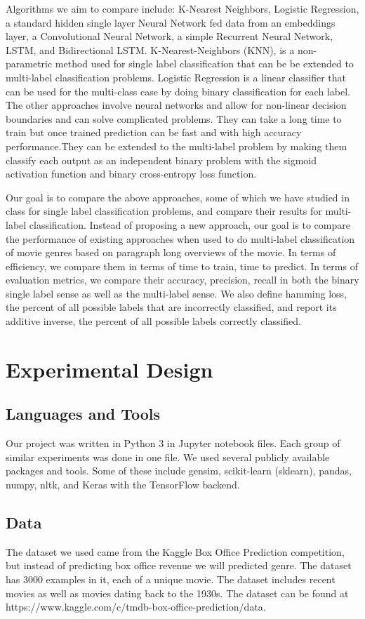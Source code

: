 \documentclass[sigconf]{acmart}
\begin{document}
Algorithms we aim to compare include: K-Nearest Neighbors, Logistic Regression, a standard hidden single layer Neural Network fed data from an embeddings layer, a Convolutional Neural Network, a simple Recurrent Neural Network, LSTM, and Bidirectional LSTM. K-Nearest-Neighbors (KNN), is a non-parametric method used for single label classification that can be be extended to multi-label classification problems. Logistic Regression is a linear classifier that can be used for the multi-class case by doing binary classification for each label. The other approaches involve neural networks and allow for non-linear decision boundaries and can solve complicated problems. They can take a long time to train but once trained prediction can be fast and with high accuracy performance.They can be extended to the multi-label problem by making them classify each output as an independent binary problem with the sigmoid activation function and binary cross-entropy loss function.  

Our goal is to compare the above approaches, some of which we have studied in class for single label classification problems, and compare their results for multi-label classification. Instead of proposing a new approach, our goal is to compare the performance of existing approaches when used to do multi-label classification of movie genres based on paragraph long overviews of the movie. In terms of efficiency, we compare them in terms of time to train, time to predict. In terms of evaluation metrics, we compare their accuracy, precision, recall in both the binary single label sense as well as the multi-label sense. We also define hamming loss, the percent of all possible labels that are incorrectly classified, and report its additive inverse, the percent of all possible labels correctly classified. 

\section{Experimental Design}
\subsection{Languages and Tools}
Our project was written in Python 3 in Jupyter notebook files.  Each group of similar experiments was done in one file.  We used several publicly available packages and tools.  Some of these include gensim, scikit-learn (sklearn), pandas, numpy, nltk, and Keras with the TensorFlow backend. 

\subsection{Data}
The dataset we used came from the Kaggle Box Office Prediction competition, but instead of predicting box office revenue we will predicted genre.  The dataset has 3000 examples in it, each of a unique movie.  The dataset includes recent movies as well as movies dating back to the 1930s. The dataset can be found at https://www.kaggle.com/c/tmdb-box-office-prediction/data.
\end{document}
